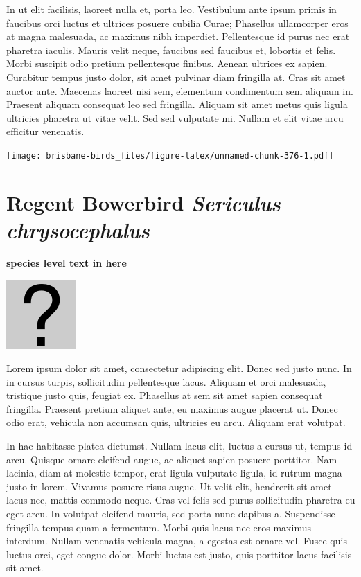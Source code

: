 \documentclass[]{book}
\let\origfigure\figure
\let\endorigfigure\endfigure
\renewenvironment{figure}[1][2] {
  \expandafter\origfigure\expandafter[H]
} {
  \endorigfigure
}
\begin{document}
In ut elit facilisis, laoreet nulla et, porta leo. Vestibulum ante ipsum
primis in faucibus orci luctus et ultrices posuere cubilia Curae;
Phasellus ullamcorper eros at magna malesuada, ac maximus nibh
imperdiet. Pellentesque id purus nec erat pharetra iaculis. Mauris velit
neque, faucibus sed faucibus et, lobortis et felis. Morbi suscipit odio
pretium pellentesque finibus. Aenean ultrices ex sapien. Curabitur
tempus justo dolor, sit amet pulvinar diam fringilla at. Cras sit amet
auctor ante. Maecenas laoreet nisi sem, elementum condimentum sem
aliquam in. Praesent aliquam consequat leo sed fringilla. Aliquam sit
amet metus quis ligula ultricies pharetra ut vitae velit. Sed sed
vulputate mi. Nullam et elit vitae arcu efficitur venenatis.

\begin{figure}
\centering
\texttt{[image: brisbane-birds\_files/figure-latex/unnamed-chunk-376-1.pdf]}
\caption{\label{fig:unnamed-chunk-376}insert figure caption}
\end{figure}

\section{\texorpdfstring{Regent Bowerbird \emph{Sericulus
chrysocephalus}}{Regent Bowerbird Sericulus chrysocephalus}}\label{regent-bowerbird-sericulus-chrysocephalus}

\textbf{species level text in here}

\begin{figure}
\centering
\includegraphics{assets/missing.png}
\caption{No image for species}
\end{figure}

Lorem ipsum dolor sit amet, consectetur adipiscing elit. Donec sed justo
nunc. In in cursus turpis, sollicitudin pellentesque lacus. Aliquam et
orci malesuada, tristique justo quis, feugiat ex. Phasellus at sem sit
amet sapien consequat fringilla. Praesent pretium aliquet ante, eu
maximus augue placerat ut. Donec odio erat, vehicula non accumsan quis,
ultricies eu arcu. Aliquam erat volutpat.

In hac habitasse platea dictumst. Nullam lacus elit, luctus a cursus ut,
tempus id arcu. Quisque ornare eleifend augue, ac aliquet sapien posuere
porttitor. Nam lacinia, diam at molestie tempor, erat ligula vulputate
ligula, id rutrum magna justo in lorem. Vivamus posuere risus augue. Ut
velit elit, hendrerit sit amet lacus nec, mattis commodo neque. Cras vel
felis sed purus sollicitudin pharetra eu eget arcu. In volutpat eleifend
mauris, sed porta nunc dapibus a. Suspendisse fringilla tempus quam a
fermentum. Morbi quis lacus nec eros maximus interdum. Nullam venenatis
vehicula magna, a egestas est ornare vel. Fusce quis luctus orci, eget
congue dolor. Morbi luctus est justo, quis porttitor lacus facilisis sit
amet.
\end{document}

